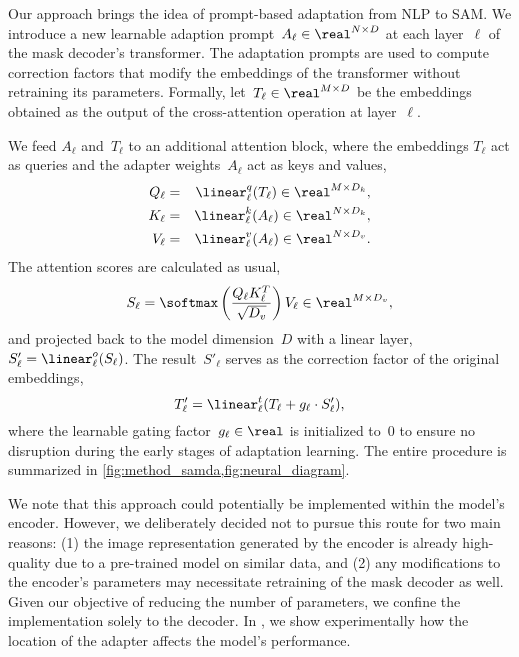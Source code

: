 Our approach brings the idea of prompt-based adaptation from NLP to SAM. We introduce a new learnable adaption prompt~$A_\ell\in\real^{N\times{}D}$ at each layer~$\ell$ of the mask decoder's transformer. The adaptation prompts are used to compute correction factors that modify the embeddings of the transformer without retraining its parameters. Formally, let~$T_\ell\in\real^{M\times D}$ be the embeddings obtained as the output of the cross-attention operation at layer~$\ell$.

We feed $A_\ell$ and~$T_\ell$ to an additional attention block, where the embeddings $T_\ell$ act as queries and the adapter weights~$A_\ell$ act as keys and values,
\begin{eqnarray}
    Q_\ell & = & \linear^q_\ell(T_{\ell}) \in \real^{M\times D_k}, \\
    K_\ell & = & \linear^k_\ell(A_{\ell}) \in \real^{N\times D_k}, \\
    V_\ell & = & \linear^v_\ell(A_{\ell}) \in \real^{N\times D_v}.
\end{eqnarray}
The attention scores are calculated as usual,
\begin{equation}
    S_\ell = \softmax\left(\dfrac{Q_\ell{}K_\ell^T}{\sqrt{D_v}}\right)V_\ell \in \real^{M\times D_v},
\end{equation}
and projected back to the model dimension~$D$ with a linear layer, $S'_\ell=\linear^o_\ell(S_\ell)$. The result~$S'_\ell$ serves as the correction factor of the original embeddings,
\begin{equation}
    T'_\ell = \linear^t_\ell(T_\ell + g_\ell \cdot S'_\ell),
\end{equation}
where the learnable gating factor~$g_\ell\in\real$ is initialized to~0 to ensure no disruption during the early stages of adaptation learning. The entire procedure is summarized in \cref{fig:method_samda,fig:neural_diagram}.



We note that this approach could potentially be implemented within the model's encoder. However, we deliberately decided not to pursue this route for two main reasons: (1) the image representation generated by the encoder is already high-quality due to a pre-trained model on similar data, and (2) any modifications to the encoder's parameters may necessitate retraining of the mask decoder as well. Given our objective of reducing the number of parameters, we confine the implementation solely to the decoder. In , we show experimentally how the location of the adapter affects the model's performance.
